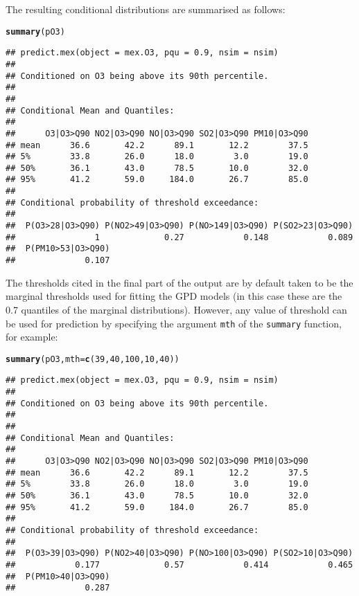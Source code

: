 \documentclass[10pt]{article}\usepackage[]{graphicx}\usepackage[]{color}
\makeatletter
\newcommand{\hlnum}[1]{\textcolor[rgb]{0.686,0.059,0.569}{#1}}%
\newcommand{\hlstd}[1]{\textcolor[rgb]{0.345,0.345,0.345}{#1}}%
\newcommand{\hlkwc}[1]{\textcolor[rgb]{0.333,0.667,0.333}{#1}}%
\newcommand{\hlkwd}[1]{\textcolor[rgb]{0.737,0.353,0.396}{\textbf{#1}}}%
\newenvironment{kframe}{%
 \def\at@end@of@kframe{}%
 \ifinner\ifhmode%
  \def\at@end@of@kframe{\end{minipage}}%
  \begin{minipage}{\columnwidth}%
 \fi\fi%
 \def\FrameCommand##1{\hskip\@totalleftmargin \hskip-\fboxsep
 \colorbox{shadecolor}{##1}\hskip-\fboxsep
     \hskip-\linewidth \hskip-\@totalleftmargin \hskip\columnwidth}%
 \MakeFramed {\advance\hsize-\width
   \@totalleftmargin\z@ \linewidth\hsize
   \@setminipage}}%
 {\par\unskip\endMakeFramed%
 \at@end@of@kframe}
\newenvironment{knitrout}{}{} %
\makeatother
\begin{document}
The resulting conditional distributions are summarised as follows:
\begin{knitrout}
\color{fgcolor}\begin{kframe}
\begin{alltt}
\hlkwd{summary}\hlstd{(pO3)}
\end{alltt}
\begin{verbatim}
## predict.mex(object = mex.O3, pqu = 0.9, nsim = nsim)
## 
## Conditioned on O3 being above its 90th percentile.
## 
## 
## Conditional Mean and Quantiles:
## 
##      O3|O3>Q90 NO2|O3>Q90 NO|O3>Q90 SO2|O3>Q90 PM10|O3>Q90
## mean      36.6       42.2      89.1       12.2        37.5
## 5%        33.8       26.0      18.0        3.0        19.0
## 50%       36.1       43.0      78.5       10.0        32.0
## 95%       41.2       59.0     184.0       26.7        85.0
## 
## Conditional probability of threshold exceedance:
## 
##  P(O3>28|O3>Q90) P(NO2>49|O3>Q90) P(NO>149|O3>Q90) P(SO2>23|O3>Q90)
##                1             0.27            0.148            0.089
##  P(PM10>53|O3>Q90)
##              0.107
\end{verbatim}
\end{kframe}
\end{knitrout}

The thresholds cited in the final part of the output are by default taken to be
the marginal thresholds used for fitting the GPD models  (in this case these are
the 0.7 quantiles of the marginal distributions).  However, any value of
threshold can be used for prediction by specifying the argument {\tt mth} of the
{\tt summary} function, for example:

\begin{knitrout}
\color{fgcolor}\begin{kframe}
\begin{alltt}
\hlkwd{summary}\hlstd{(pO3,}\hlkwc{mth}\hlstd{=}\hlkwd{c}\hlstd{(}\hlnum{39}\hlstd{,}\hlnum{40}\hlstd{,}\hlnum{100}\hlstd{,}\hlnum{10}\hlstd{,}\hlnum{40}\hlstd{))}
\end{alltt}
\begin{verbatim}
## predict.mex(object = mex.O3, pqu = 0.9, nsim = nsim)
## 
## Conditioned on O3 being above its 90th percentile.
## 
## 
## Conditional Mean and Quantiles:
## 
##      O3|O3>Q90 NO2|O3>Q90 NO|O3>Q90 SO2|O3>Q90 PM10|O3>Q90
## mean      36.6       42.2      89.1       12.2        37.5
## 5%        33.8       26.0      18.0        3.0        19.0
## 50%       36.1       43.0      78.5       10.0        32.0
## 95%       41.2       59.0     184.0       26.7        85.0
## 
## Conditional probability of threshold exceedance:
## 
##  P(O3>39|O3>Q90) P(NO2>40|O3>Q90) P(NO>100|O3>Q90) P(SO2>10|O3>Q90)
##            0.177             0.57            0.414            0.465
##  P(PM10>40|O3>Q90)
##              0.287
\end{verbatim}
\end{kframe}
\end{knitrout}
\end{document}
